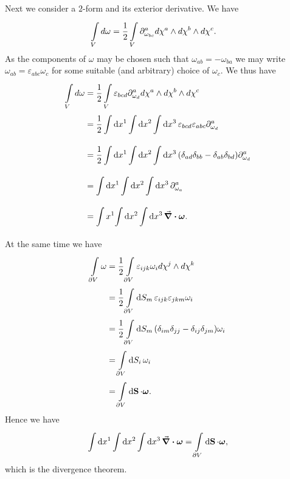 Next we consider a $2$-form and its exterior derivative. We have
\begin{align*}
	\int\limits_{V}^{}{d\omega} &= \frac{1}{2}\int\limits_{V}^{}{\partial^{a}_{\omega_{bc}}d\chi^{a}\wedge d\chi^{b}\wedge d\chi^{c}}.
\end{align*}
As the components of $\omega$ may be chosen such that $\omega_{ab} = -\omega_{ba}$ we may write $\omega_{ab} = \varepsilon_{abc}\omega_{c}$ for some suitable (and arbitrary) choice of $\omega_{c}$. We thus have
\begin{align*}
	\int\limits_{V}^{}{d\omega} &= \frac{1}{2}\int\limits_{V}^{}{\varepsilon_{bcd}\partial^{a}_{\omega_{d}}d\chi^{a}\wedge d\chi^{b}\wedge d\chi^{c}} \\
	                        &= \frac{1}{2}\int\limits_{}^{}\dd{x^{1}}{\int\limits_{}^{}\dd{x^{2}}{\int\limits_{}^{}\dd{x^{3}}{\varepsilon_{bcd}\varepsilon_{abc}\ensuremath{\partial^{a}_{\omega_{d}}}}}} \\
	                        &= \frac{1}{2}\int\limits_{}^{}\dd{x^{1}}{\int\limits_{}^{}\dd{x^{2}}{\int\limits_{}^{}\dd{x^{3}}{(\delta_{ad}\delta_{bb} - \delta_{ab}\delta_{bd})\ensuremath{\partial^{a}_{\omega_{d}}}}}} \\
	                        &= \int\limits_{}^{}\dd{x^{1}}{\int\limits_{}^{}\dd{x^{2}}{\int\limits_{}^{}\dd{x^{3}}{\ensuremath{\partial^{a}_{\omega_{a}}}}}} \\
	                        &= \int\limits_{}^{}{x^{1}}{\int\limits_{}^{}\dd{x^{2}}{\int\limits_{}^{}\dd{x^{3}}{\div{\vb*{\omega}}}}}.
\end{align*}
At the same time we have
\begin{align*}
	\int\limits_{\partial V}^{}{\omega} &= \frac{1}{2}\int\limits_{\partial V}^{}{\varepsilon_{ijk}\omega_{i}d\chi^{j}\wedge d\chi^{k}} \\
	                           &= \frac{1}{2}\int\limits_{\partial V}^{}\dd{S_{m}}{\varepsilon_{ijk}\varepsilon_{jkm}\omega_{i}} \\
	                           &= \frac{1}{2}\int\limits_{\partial V}^{}\dd{S_{m}}{(\delta_{im}\delta_{jj} - \delta_{ij}\delta_{jm})\omega_{i}} \\
	                           &= \int\limits_{\partial V}^{}\dd{S_{i}}{\omega_{i}} \\
	                           &= \int\limits_{\partial V}^{}\dd{\vb{S}}{\cdot\vb*{\omega}}.
\end{align*}
Hence we have
\begin{align*}
	\int\limits_{}^{}\dd{x^{1}}{\int\limits_{}^{}\dd{x^{2}}{\int\limits_{}^{}\dd{x^{3}}{\div{\vb*{\omega}}}}} = \int\limits_{\partial V}^{}\dd{\vb{S}}{\cdot\vb*{\omega}},
\end{align*}
which is the divergence theorem.

